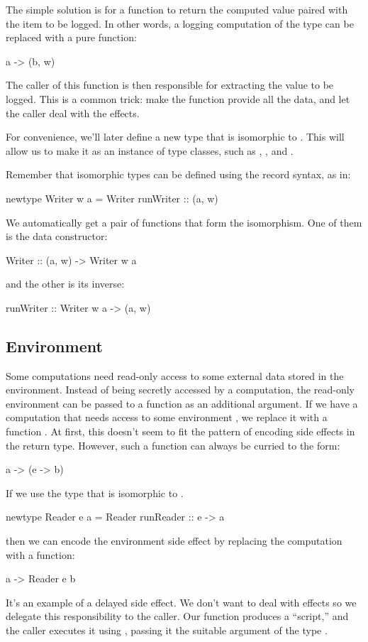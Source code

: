 \documentclass[DaoFP]{subfiles}
\begin{document}
The simple solution is for a function to return the computed value paired with the item to be logged. In other words, a logging computation of the type  can be replaced with a pure function:
\begin{haskell}
a -> (b, w)
\end{haskell}
The caller of this function is then responsible for extracting the value to be logged. This is a common trick: make the function provide all the data, and let the caller deal with the effects.

For convenience, we'll later define a new type  that is isomorphic to . This will allow us to make it as an instance of type classes, such as , , and . 

Remember that isomorphic types can be defined using the record syntax, as in:
\begin{haskell}
newtype Writer w a = Writer { runWriter :: (a, w) }
\end{haskell}
We automatically get a pair of functions that form the isomorphism. One of them is the data constructor:
\begin{haskell}
Writer :: (a, w) -> Writer w a
\end{haskell}
and the other is its inverse:
\begin{haskell}
runWriter :: Writer w a -> (a, w) 
\end{haskell}

\subsection{Environment}

Some computations need read-only access to some external data stored in the environment. Instead of being secretly accessed by a computation, the read-only environment can be passed to a function as an additional argument. If we have a computation  that needs access to some environment , we replace it with a function . At first, this doesn't seem to fit the pattern of encoding side effects in the return type. However, such a function can always be curried to the form:
\begin{haskell}
a -> (e -> b)
\end{haskell}
If we use the type  that is isomorphic to .
\begin{haskell}
newtype Reader e a = Reader { runReader :: e -> a }
\end{haskell}
then we can encode the environment side effect by replacing the computation  with a function:
\begin{haskell}
a -> Reader e b
\end{haskell}
It's an example of a delayed side effect. We don't want to deal with effects so we delegate this responsibility to the caller. Our function produces a ``script,'' and the caller executes it using ,  passing it the suitable argument of the type .
\end{document}
